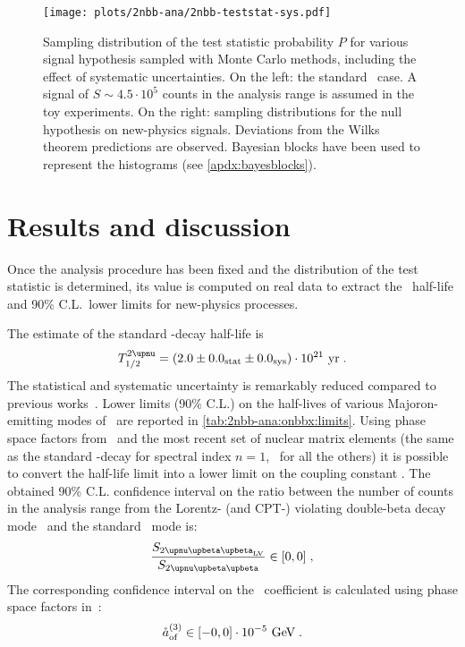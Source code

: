 \begin{figure}
  \centering
  \texttt{[image: plots/2nbb-ana/2nbb-teststat-sys.pdf]}
  \caption{%
    Sampling distribution of the test statistic probability $P$ for various signal
    hypothesis sampled with Monte Carlo methods, including the effect of systematic
    uncertainties. On the left: the standard \nnbb\ case. A signal of $S \sim 4.5 \cdot
    10^5$ counts in the analysis range is assumed in the toy experiments. On the right:
    sampling distributions for the null hypothesis on new-physics signals.  Deviations
    from the Wilks theorem predictions are observed. Bayesian blocks have been used to
    represent the histograms (see \cref{apdx:bayesblocks}). 
  }\label{fig:2nbb-ana:ts-dist-sys}
\end{figure}

\begin{table}
  \centering
  \caption{%
    Summary of the systematic uncertainties affecting the \nnbb\ distribution analysis.
    For brevity, only results for the ordinary \nnbb\ half-life estimate and the \onbbx\
    ($n=1$) 90\% C.L.~lower limit are reported.
  }\label{tab:2nbb-ana:systematics}
  
\end{table}

\section{Results and discussion}%
\label{sec:2nbb-ana:results}

Once the analysis procedure has been fixed and the distribution of the test statistic is
determined, its value is computed on real data to extract the \nnbb\ half-life and 90\%
C.L.~lower limits for new-physics processes.

The estimate of the standard \nnbb-decay half-life is
\[
  \thalftwoM = (2.0 \pm \stat{0.0} \pm \syst{0.0}) \cdot 10^{21}~\text{yr} \;.
\]
The statistical and systematic uncertainty is remarkably reduced compared to previous
works~\cite{Agostini2015a}.
\newpar
Lower limits (90\% C.L.) on the half-lives of various Majoron-emitting modes of \onbb\ are
reported in \cref{tab:2nbb-ana:onbbx:limits}. Using phase space factors
from~\cite{Kotila2015} and the most recent set of nuclear matrix elements (the same as the
standard \onbb-decay for spectral index $n=1$,~\cite{Hirsch1995} for all the others) it is
possible to convert the half-life limit into a lower limit on the coupling constant \ga.
\newpar
The obtained 90\% C.L. confidence interval on the ratio between the number of counts in
the analysis range from the Lorentz- (and CPT-) violating double-beta decay mode \nnbblv\
and the standard \nnbb\ mode is:
\[
  \frac{S_\nnbblvM}{S_\nnbbM} \in [0,0] \;,
\]
The corresponding confidence interval on the \aof\ coefficient is calculated using phase
space factors in~\cite{Nitescu2020}:
\[
  {\mathring{a}_\text{of}^{(3)}} \in [-0, 0] \cdot 10^{-5}~\text{GeV} \;.
\]

